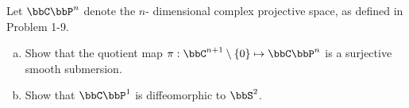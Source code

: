 Let $\bbC\bbP^n$ denote the $n$- dimensional complex projective space, as defined in Problem 1-9.

\begin{enumerate}[a)]
\item Show that the quotient map $\pi:\bbC^{n+1}\setminus \{0\} \mapsto \bbC \bbP^{n}$ is a surjective smooth submersion.
\item Show that $\bbC\bbP^1$ is diffeomorphic to $\bbS^2$.
\end{enumerate}